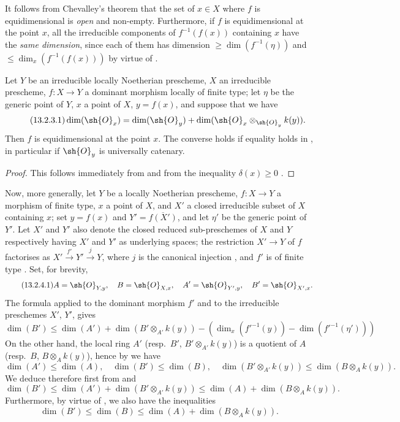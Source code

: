It follows from Chevalley's theorem  that the set of $x\in X$ where $f$ is equidimensional is \emph{open} and non-empty.
Furthermore, if $f$ is equidimensional at the point $x$, all the irreducible components of $f^{-1}(f(x))$ containing $x$ have the \emph{same dimension}, since each of them has dimension $\geq\dim(f^{-1}(\eta))$  and $\leq\dim_x(f^{-1}(f(x)))$ by virtue of .

\begin{proposition}[13.2.3]
\label{IV.13.2.3}
Let $Y$ be an irreducible locally Noetherian prescheme, $X$ an irreducible prescheme, $f:X\to Y$ a dominant morphism locally of finite type; let $\eta$ be the generic point of $Y$, $x$ a point of $X$, $y=f(x)$, and suppose that we have
\[
\tag{13.2.3.1}
  \dim(\sh{O}_x)=\dim(\sh{O}_y)+\dim(\sh{O}_x\otimes_{\sh{O}_y}k(y)).
\]
Then $f$ is equidimensional at the point $x$.
The converse holds if equality holds in , in particular if $\sh{O}_y$ is universally catenary.
\end{proposition}

\begin{proof}
This follows immediately from  and from the inequality $\delta(x)\geq 0$ .
\end{proof}

\begin{env}[13.2.4]
\label{IV.13.2.4}
Now, more generally, let $Y$ be a locally Noetherian prescheme, $f:X\to Y$ a morphism of finite type, $x$ a point of $X$, and $X'$ a closed irreducible subset of $X$ containing $x$; set $y=f(x)$ and $Y'=\overline{f(X')}$, and let $\eta'$ be the generic point of $Y'$.
Let $X'$ and $Y'$ also denote the closed reduced sub-preschemes of $X$ and $Y$ respectively having $X'$ and $Y'$ as underlying spaces; the restriction $X'\to Y$ of $f$ factorises as $X'\xrightarrow{f'}Y'\xrightarrow{j}Y$, where $j$ is the canonical injection , and $f'$ is of finite type .
Set, for brevity,
\[
\tag{13.2.4.1}
  A=\sh{O}_{Y,y},\quad B=\sh{O}_{X,x},\quad A'=\sh{O}_{Y',y},\quad B'=\sh{O}_{X',x}.
\]
The formula  applied to the dominant morphism $f'$ and to the irreducible preschemes $X'$, $Y'$, gives
\[
\tag{13.2.4.2}
  \dim(B')\leq\dim(A')+\dim(B'\otimes_{A'}k(y))-(\dim_x(f'^{-1}(y))-\dim(f'^{-1}(\eta')))
\]
On the other hand, the local ring $A'$ (resp.\ $B'$, $B'\otimes_{A'}k(y)$) is a quotient of $A$ (resp.\ $B$, $B\otimes_A k(y)$), hence by  we have
\[
\tag{13.2.4.3}
\label{IV.13.2.4.3}
  \dim(A')\leq\dim(A),\quad \dim(B')\leq\dim(B),\quad \dim(B'\otimes_{A'}k(y))\leq\dim(B\otimes_A k(y)).
\]
We deduce therefore first from  and 
\[
\tag{13.2.4.4}
  \dim(B')\leq\dim(A')+\dim(B'\otimes_{A'}k(y))\leq\dim(A)+\dim(B\otimes_A k(y)).
\]
Furthermore, by virtue of , we also have the inequalities
\[
\tag{13.2.4.5}
  \dim(B')\leq\dim(B)\leq\dim(A)+\dim(B\otimes_A k(y)).
\]
\end{env}

